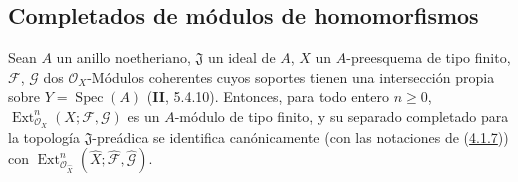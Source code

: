 \subsection{Completados de módulos de homomorfismos}
\label{subsection:III.4.5-fr}

\begin{proposition}[4.5.1]
\label{III.4.5.1-fr}
Sean $A$ un anillo noetheriano, $\mathfrak J$ un ideal de $A$, $X$ un
$A$-preesquema de tipo finito, $\mathcal F$, $\mathcal G$ dos
$\mathcal O_X$-Módulos coherentes cuyos soportes tienen una intersección
propia sobre $Y=\operatorname{Spec}(A)$ \textup{(\textbf{II}, 5.4.10)}. Entonces, para todo entero
$n\geq0$, $\operatorname{Ext}^n_{\mathcal O_X}(X;\mathcal F,\mathcal G)$ es un $A$-módulo
de tipo finito, y su separado completado para la topología $\mathfrak J$-preádica
se identifica canónicamente (con las notaciones de
\textup{(\hyperref[III.4.1.7-fr]{4.1.7})}) con
$\operatorname{Ext}^n_{\mathcal O_{\widehat X}}(\widehat X;\widehat{\mathcal F},
\widehat{\mathcal G})$.
\end{proposition}

